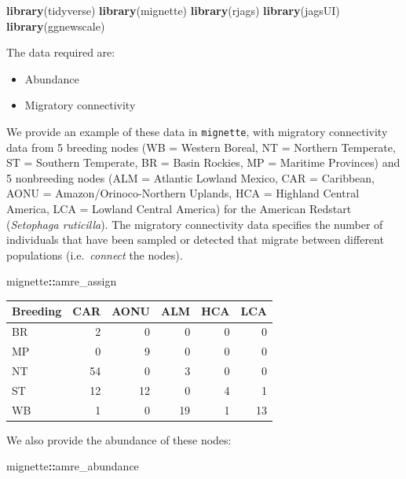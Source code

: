 \documentclass[
]{book}
\newenvironment{Shaded}{\begin{snugshade}}{\end{snugshade}}
\newcommand{\FunctionTok}[1]{\textcolor[rgb]{0.13,0.29,0.53}{\textbf{#1}}}
\newcommand{\NormalTok}[1]{#1}
\newcommand{\SpecialCharTok}[1]{\textcolor[rgb]{0.81,0.36,0.00}{\textbf{#1}}}
\providecommand{\tightlist}{%
  \setlength{\itemsep}{0pt}\setlength{\parskip}{0pt}}
\begin{document}
\begin{Shaded}
\begin{Highlighting}[]
\FunctionTok{library}\NormalTok{(tidyverse)}
\FunctionTok{library}\NormalTok{(mignette)}
\FunctionTok{library}\NormalTok{(rjags)}
\FunctionTok{library}\NormalTok{(jagsUI)}
\FunctionTok{library}\NormalTok{(ggnewscale)}
\end{Highlighting}
\end{Shaded}

The data required are:

\begin{itemize}
\tightlist
\item
  Abundance
\item
  Migratory connectivity
\end{itemize}

We provide an example of these data in \texttt{mignette}, with migratory connectivity data from 5 breeding nodes (WB = Western Boreal, NT = Northern Temperate, ST = Southern Temperate, BR = Basin Rockies, MP = Maritime Provinces) and 5 nonbreeding nodes (ALM = Atlantic Lowland Mexico, CAR = Caribbean, AONU = Amazon/Orinoco-Northern Uplands, HCA = Highland Central America, LCA = Lowland Central America) for the American Redstart (\emph{Setophaga ruticilla}). The migratory connectivity data specifies the number of individuals that have been sampled or detected that migrate between different populations (i.e.~\emph{connect} the nodes).

\begin{Shaded}
\begin{Highlighting}[]
\NormalTok{mignette}\SpecialCharTok{::}\NormalTok{amre\_assign}
\end{Highlighting}
\end{Shaded}

\begin{tabular}{l|r|r|r|r|r}
\hline
Breeding & CAR & AONU & ALM & HCA & LCA\\
\hline
BR & 2 & 0 & 0 & 0 & 0\\
\hline
MP & 0 & 9 & 0 & 0 & 0\\
\hline
NT & 54 & 0 & 3 & 0 & 0\\
\hline
ST & 12 & 12 & 0 & 4 & 1\\
\hline
WB & 1 & 0 & 19 & 1 & 13\\
\hline
\end{tabular}

We also provide the abundance of these nodes:

\begin{Shaded}
\begin{Highlighting}[]
\NormalTok{mignette}\SpecialCharTok{::}\NormalTok{amre\_abundance}
\end{Highlighting}
\end{Shaded}
\end{document}
